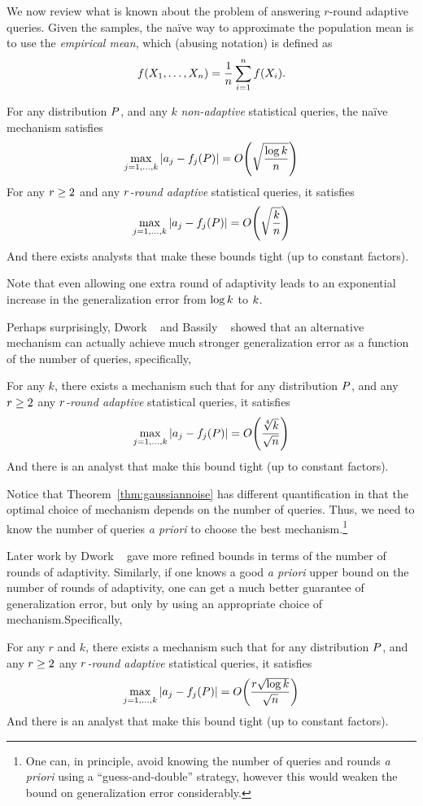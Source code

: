 We now review what is known about the problem of answering $r$-round adaptive queries.  Given the samples, the na\"ive way to approximate the population mean is to use the \emph{empirical mean}, which (abusing notation) is defined as $$f(X_1,\dots,X_n) = \frac{1}{n} \sum_{i=1}^{n} f(X_i).$$
\begin{thm} For any distribution $P$, and any $k$ \emph{non-adaptive} statistical queries, the na\"ive mechanism satisfies
$$
\max_{j=1,\dots,\qlen} | \answer_j - \query_j(\dist) | = O\left( \sqrt{\frac{\log \qlen}{n}}  \right)
$$
For any $r \geq 2$ and any \emph{$r$-round adaptive} statistical queries, it satisfies
$$
\max_{j=1,\dots,\qlen} | \answer_j - \query_j(\dist) | = O\left( \sqrt{\frac{\qlen}{n}}  \right)
$$
And there exists analysts that make these bounds tight (up to constant factors).
\end{thm}

Note that even allowing one extra round of adaptivity leads to an exponential increase in the generalization error from $\log k$ to $k$.

Perhaps surprisingly, Dwork \etal~\cite{DworkFHPRR15} and Bassily \etal~\cite{BassilyNSSSU16} showed that an alternative mechanism can actually achieve much stronger generalization error as a function of the number of queries, specifically, 
\begin{thm} \label{thm:gaussiannoise} For any $k$, there exists a mechanism such that for any distribution $P$, and any $r \geq 2$ any \emph{$r$-round adaptive} statistical queries, it satisfies
$$
\max_{j=1,\dots,\qlen} | \answer_j - \query_j(\dist) | = O\left( \frac{\sqrt[4]{\qlen}}{\sqrt{n}}  \right)
$$
And there is an analyst that make this bound tight (up to constant factors).
\end{thm}
Notice that Theorem~\ref{thm:gaussiannoise} has different quantification in that the optimal choice of mechanism depends on the number of queries.  Thus, we need to know the number of queries \emph{a priori} to choose the best mechanism.\footnote{ \label{fn1} One can, in principle, avoid knowing the number of queries and rounds \emph{a priori} using a ``guess-and-double'' strategy, however this would weaken the bound on generalization error considerably.}

Later work by Dwork \etal~\cite{??} gave more refined bounds in terms of the number of rounds of adaptivity.  Similarly, if one knows a good \emph{a priori} upper bound on the number of rounds of adaptivity, one can get a much better guarantee of generalization error, but only by using an appropriate choice of mechanism.\footnotemark[\ref{fn1}]  Specifically, 
\begin{thm}[\cite{??}] \label{thm:gaussiannoise} For any $r$ and $k$, there exists a mechanism such that for any distribution $P$, and any $r \geq 2$ any \emph{$r$-round adaptive} statistical queries, it satisfies
$$
\max_{j=1,\dots,\qlen} | \answer_j - \query_j(\dist) | = O\left( \frac{r \sqrt{\log k}}{\sqrt{n}}  \right)
$$
And there is an analyst that make this bound tight (up to constant factors).
\end{thm}

